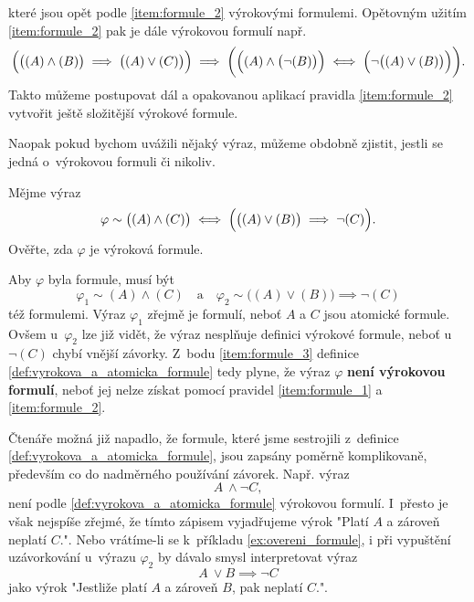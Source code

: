 které jsou opět podle \ref{item:formule_2} výrokovými formulemi. Opětovným užitím \ref{item:formule_2} pak je dále výrokovou formulí např.
\begin{equation*}
    \Bigl(\bigl((A) \land (B)\bigr) \implies \bigl((A) \lor (C)\bigr)\Bigr) \implies \bigg(\Bigl((A) \land \bigl(\neg(B)\bigr)\Bigr) \iff \Bigl(\neg\bigl((A) \lor (B)\bigr)\Bigr)\bigg).
\end{equation*}
Takto můžeme postupovat dál a opakovanou aplikací pravidla \ref{item:formule_2} vytvořit ještě složitější výrokové formule.\par
Naopak pokud bychom uvážili nějaký výraz, můžeme obdobně zjistit, jestli se jedná o~výrokovou formuli či nikoliv.
\begin{example}\label{ex:overeni_formule}
    Mějme výraz
    \begin{equation*}
        \varphi\sim\bigl((A) \land (C)\bigr) \iff \Bigl(\bigl((A) \lor (B)\bigr) \implies \neg(C)\Bigr).
    \end{equation*}
    Ověřte, zda $\varphi$ je výroková formule.\par
    \begin{solution}
        Aby $\varphi$ byla formule, musí být
        \begin{equation*}
            \varphi_1\sim(A) \land (C)\quad\text{a}\quad\varphi_2\sim\bigl((A) \lor (B)\bigr) \implies \neg(C)
        \end{equation*}
        též formulemi. Výraz $\varphi_1$ zřejmě je formulí, neboť $A$ a $C$ jsou atomické formule. Ovšem u~$\varphi_2$ lze již vidět, že výraz nesplňuje definici výrokové formule, neboť u~$\neg(C)$ chybí vnější závorky. Z~bodu \ref{item:formule_3} definice \ref{def:vyrokova_a_atomicka_formule} tedy plyne, že výraz $\varphi$ \textbf{není výrokovou formulí}, neboť jej nelze získat pomocí pravidel \ref{item:formule_1} a \ref{item:formule_2}.
    \end{solution}
\end{example}

Čtenáře možná již napadlo, že formule, které jsme sestrojili z~definice \ref{def:vyrokova_a_atomicka_formule}, jsou zapsány poměrně komplikovaně, především co do nadměrného používání závorek. Např. výraz
\begin{equation}\label{eq:poradi_operaci}
    A~\land \neg C,
\end{equation}
není podle \ref{def:vyrokova_a_atomicka_formule} výrokovou formulí. I~přesto je však nejspíše zřejmé, že tímto zápisem vyjadřujeme výrok "Platí $A$ a zároveň neplatí $C$.". Nebo vrátíme-li se k~příkladu \ref{ex:overeni_formule}, i při vypuštění uzávorkování u~výrazu $\varphi_2$ by dávalo smysl interpretovat výraz
\begin{equation*}\label{eq:vypusteni_uzavorkovani}
    A~\lor B \implies \neg C
\end{equation*}
jako výrok "Jestliže platí $A$ a zároveň $B$, pak neplatí $C$.".